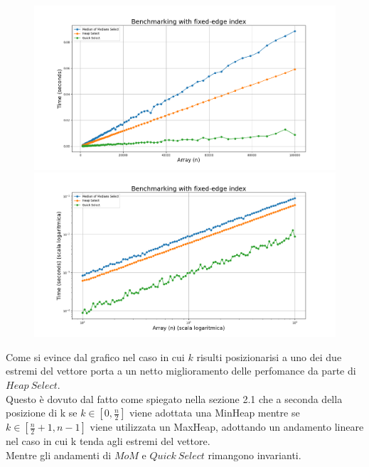 \documentclass[a4paper]{article}
\begin{document}
\newpage
\begin{figure}[h]
            \centering
            \includegraphics[width=.83\textwidth]{graphs/k_last_n.png}
            \includegraphics[width=.83\textwidth]{graphs/k_last_2xlog.png}
\end{figure}
Come si evince dal grafico nel caso in cui $k$ risulti posizionarisi a uno dei due estremi del vettore porta a un netto miglioramento delle perfomance da parte di $Heap\ Select$.\\
Questo è dovuto dal fatto come spiegato nella sezione 2.1 che a seconda della posizione di k se $k\in[0,\frac{n}{2}]$ viene adottata una MinHeap mentre se $k\in[\frac{n}{2}+1,n-1]$ viene utilizzata un MaxHeap, adottando un andamento lineare nel caso in cui k tenda agli estremi del vettore.\\
Mentre gli andamenti di $MoM$ e $Quick\ Select$ rimangono invarianti.\\
\newpage
\end{document}

